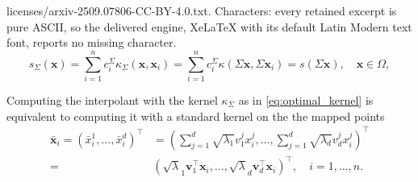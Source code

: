 \documentclass[10pt,a4paper]{amsart}
\newcommand{\mSigma}{\mathsf{\Sigma}}
\begin{document}
licenses/arxiv-2509.07806-CC-BY-4.0.txt. Characters: every retained excerpt is pure ASCII, so the delivered engine, XeLaTeX with its default Latin Modern text font, reports no missing character.
\begin{equation} \label{eq:optimal_kernel}
    s_{\mSigma}(\boldsymbol{x})  = \sum_{i=1}^n c^{\mSigma}_i \kappa_{\mSigma}(\boldsymbol{x},\boldsymbol{x}_i) = \sum_{i=1}^n c^{\mSigma}_i \kappa(\mSigma \boldsymbol{x}, \mSigma \boldsymbol{x}_i) = s( \mSigma \boldsymbol{x}), \quad \boldsymbol{x} \in \Omega, 
\end{equation}

\begin{proposition}
    Computing the interpolant with the kernel $\kappa_{\mSigma}$ as in \eqref{eq:optimal_kernel} is equivalent to computing it with a standard kernel on the the mapped points 
    \begin{align*}
        \bar{\boldsymbol{x}}_i = ({\bar{x}}_{i}^1, \ldots, {\bar{x}}_{i}^d)^{\intercal} & =  \left(\sum_{j=1}^d \sqrt{\lambda_1}v_1^j{{x}}_{i}^j, \ldots, \sum_{j=1}^d \sqrt{\lambda_d}v_d^j{{x}}_{i}^j\right)^{\intercal} \\  = &  \left( \sqrt{\lambda}_1{\boldsymbol{v}}_1^{\intercal} {\boldsymbol{x}}_i, \ldots, \sqrt{\lambda}_d{\boldsymbol{v}}_d^{\intercal} {\boldsymbol{x}}_i\right )^{\intercal}, \quad i= 1,\ldots,n.
    \end{align*}
\end{proposition}
\end{document}
